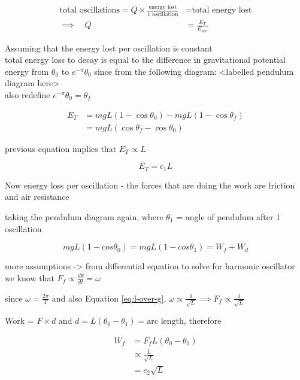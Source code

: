 \documentclass[12pt]{article}
\begin{document}
\begin{align*}
    \text{total oscillations} = Q \times \frac{\text{energy lost}}{\text{1 oscillation}} &= \text{total energy lost} \\
    \implies \quad Q &= \frac{E_T}{E_{osc}}
\end{align*}

Assuming that the energy lost per oscillation is constant \\

total energy loss to decay is equal to the difference in gravitational potential energy from $\theta_0$ to $e^{-\pi}\theta_0$ since from the following diagram:
<labelled pendulum diagram here> \\

also redefine $e^{-\pi}\theta_0 = \theta_f$

\begin{align*}
    E_T &= mgL(1-\cos\theta_0) - mgL(1-\cos\theta_f)\\
    &= mgL(\cos\theta_f-\cos\theta_0)
\end{align*}

previous equation implies that $E_T \propto L$

\begin{equation}
    E_T = c_1 L
\end{equation}

Now energy loss per oscillation - the forces that are doing the work are friction and air resistance

taking the pendulum diagram again, where $\theta_1$ = angle of pendulum after 1 oscillation

\begin{equation}
    mgL(1-cos\theta_0) = mgL(1-cos\theta_1) = W_{f} + W_{d}
\end{equation}

more assumptions -> from differential equation to solve for harmonic oscillator we know that $F_f \propto \frac{d\theta}{dt} = \omega$

since $\omega = \frac{2\pi}{T}$ and also Equation \ref{eq:l-over-g}, $\omega \propto \frac{1}{\sqrt{L}} \implies F_f \propto \frac{1}{\sqrt{L}}$

Work = $F\times d$ and $d = L(\theta_0 - \theta_1) = \text{arc length}$, therefore

\begin{align}
    W_f &= F_f L(\theta_0 - \theta_1) \\
    &\propto \frac{L}{\sqrt{L}} \\
    &= c_2\sqrt{L}
\end{align}
\end{document}
